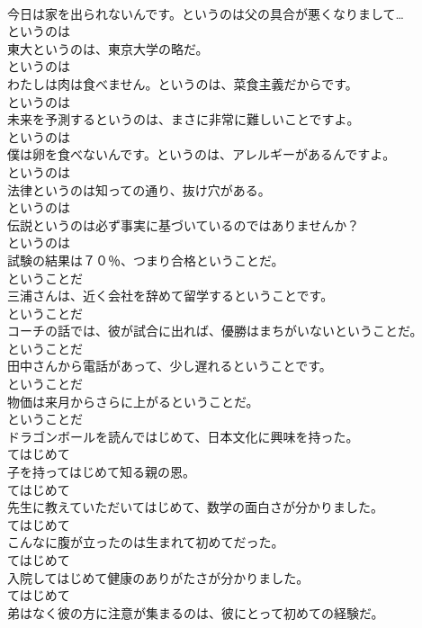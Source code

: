 \documentclass[8pt]{extreport}
\begin{document}
\begin{CJK}{UTF8}{min}
\\	今日は家を出られないんです。というのは父の具合が悪くなりまして…	
\\	というのは	
\\	東大というのは、東京大学の略だ。	
\\	というのは	
\\	わたしは肉は食べません。というのは、菜食主義だからです。	
\\	というのは	
\\	未来を予測するというのは、まさに非常に難しいことですよ。	
\\	というのは	
\\	僕は卵を食べないんです。というのは、アレルギーがあるんですよ。	
\\	というのは	
\\	法律というのは知っての通り、抜け穴がある。	
\\	というのは	
\\	伝説というのは必ず事実に基づいているのではありませんか？	
\\	というのは	
\\	試験の結果は７０％、つまり合格ということだ。	
\\	ということだ	
\\	三浦さんは、近く会社を辞めて留学するということです。	
\\	ということだ	
\\	コーチの話では、彼が試合に出れば、優勝はまちがいないということだ。	
\\	ということだ	
\\	田中さんから電話があって、少し遅れるということです。	
\\	ということだ	
\\	物価は来月からさらに上がるということだ。	
\\	ということだ	
\\	ドラゴンボールを読んではじめて、日本文化に興味を持った。	
\\	てはじめて	
\\	子を持ってはじめて知る親の恩。	
\\	てはじめて	
\\	先生に教えていただいてはじめて、数学の面白さが分かりました。	
\\	てはじめて	
\\	こんなに腹が立ったのは生まれて初めてだった。	
\\	てはじめて	
\\	入院してはじめて健康のありがたさが分かりました。	
\\	てはじめて	
\\	弟はなく彼の方に注意が集まるのは、彼にとって初めての経験だ。	

\end{CJK}
\end{document}
